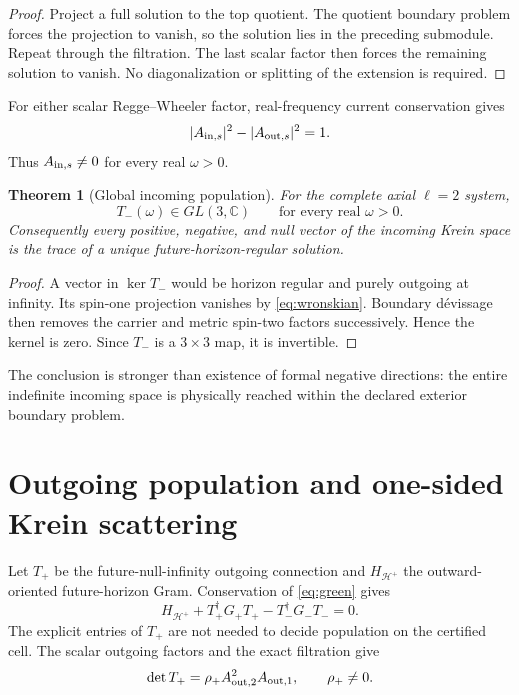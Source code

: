\documentclass[11pt]{article}
\newtheorem{theorem}{Theorem}[section]
\theoremstyle{definition}
\theoremstyle{remark}
\newcommand{\C}{\mathbb C}
\begin{document}
\begin{proof}
Project a full solution to the top quotient.  The quotient boundary problem
forces the projection to vanish, so the solution lies in the preceding
submodule.  Repeat through the filtration.  The last scalar factor then
forces the remaining solution to vanish.  No diagonalization or splitting of
the extension is required.
\end{proof}

For either scalar Regge--Wheeler factor, real-frequency current conservation
gives
\begin{equation}
\label{eq:wronskian}
|A_{{\rm in},s}|^2-|A_{{\rm out},s}|^2=1.
\end{equation}
Thus \(A_{{\rm in},s}\neq0\) for every real \(\omega>0\).

\begin{theorem}[Global incoming population]
\label{thm:incoming}
For the complete axial \(\ell=2\) system,
\[
T_-(\omega)\in GL(3,\C)
\qquad\text{for every real }\omega>0.
\]
Consequently every positive, negative, and null vector of the incoming
Krein space is the trace of a unique future-horizon-regular solution.
\end{theorem}

\begin{proof}
A vector in \(\ker T_-\) would be horizon regular and purely outgoing at
infinity.  Its spin-one projection vanishes by
\eqref{eq:wronskian}.  Boundary d\'evissage then removes the carrier and
metric spin-two factors successively.  Hence the kernel is zero.  Since
\(T_-\) is a \(3\times3\) map, it is invertible.
\end{proof}

The conclusion is stronger than existence of formal negative directions:
the entire indefinite incoming space is physically reached within the
declared exterior boundary problem.

\section{Outgoing population and one-sided Krein scattering}

Let \(T_+\) be the future-null-infinity outgoing connection and
\(H_{\mathcal H^+}\) the outward-oriented future-horizon Gram.  Conservation
of \eqref{eq:green} gives
\begin{equation}
\label{eq:stokes}
H_{\mathcal H^+}
+T_+^\dagger G_+T_+
-T_-^\dagger G_-T_-=0.
\end{equation}
The explicit entries of \(T_+\) are not needed to decide population on the
certified cell.  The scalar outgoing factors and the exact filtration give
\[
\det T_+=\rho_+A_{{\rm out},2}^2A_{{\rm out},1},
\qquad \rho_+\neq0.
\]
\end{document}

